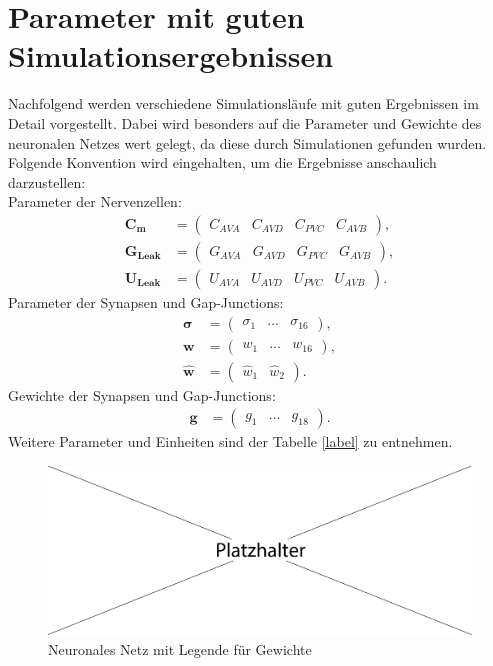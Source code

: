 \chapter{Parameter mit guten Simulationsergebnissen}
%
	Nachfolgend werden verschiedene Simulationsläufe mit guten Ergebnissen im Detail vorgestellt. Dabei wird besonders auf die Parameter und Gewichte des neuronalen Netzes wert gelegt, da diese durch Simulationen gefunden wurden.\\
	Folgende Konvention wird eingehalten, um die Ergebnisse anschaulich darzustellen:\\
	Parameter der Nervenzellen:
	\begin{align}
		\boldsymbol{C_m} &= \begin{pmatrix}C_{AVA} & C_{AVD} & C_{PVC} & C_{AVB}\end{pmatrix},\\
		\boldsymbol{G_{Leak}} &= \begin{pmatrix}G_{AVA} & G_{AVD} & G_{PVC} & G_{AVB}\end{pmatrix},\\
		\boldsymbol{U_{Leak}} &= \begin{pmatrix}U_{AVA} & U_{AVD} & U_{PVC} & U_{AVB}\end{pmatrix}.
	\end{align}
	Parameter der Synapsen und Gap-Junctions:
	\begin{align}
		\boldsymbol{\sigma} &= \begin{pmatrix}\sigma_1 & \dots & \sigma_{16}\end{pmatrix},\\
		\boldsymbol{w} &= \begin{pmatrix}w_1 & \dots & w_{16}\end{pmatrix},\\
		\boldsymbol{\hat{w}} &= \begin{pmatrix}\hat{w}_1 & \hat{w}_{2}\end{pmatrix}.
	\end{align}
	Gewichte der Synapsen und Gap-Junctions:
	\begin{align}
		\boldsymbol{g} &= \begin{pmatrix}g_1 & \dots & g_{18}\end{pmatrix}.
	\end{align}
	Weitere Parameter und Einheiten sind der Tabelle \ref{label} zu entnehmen.
	\begin{figure}[!h] %
		\centering
		\includegraphics[width=12cm]{figures/sonstiges/platzhalter.pdf}
		\caption{Neuronales Netz mit Legende für Gewichte}
		\label{fig:erg_rs_flow}
	\end{figure}


